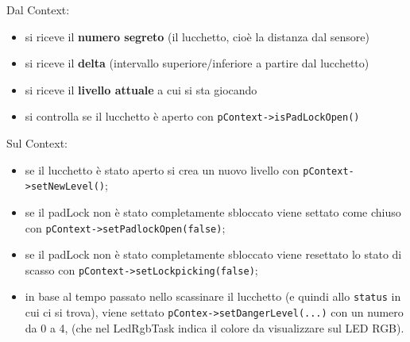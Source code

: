 Dal Context:
\begin{itemize}
	\item si riceve il \textbf{numero segreto} (il lucchetto, cioè la distanza dal sensore)
	\item si riceve il \textbf{delta} (intervallo superiore/inferiore a partire dal lucchetto)
	\item si riceve il \textbf{livello attuale} a cui si sta giocando
	\item si controlla se il lucchetto è aperto con \texttt{pContext->isPadLockOpen()}
\end{itemize}
Sul Context:
\begin{itemize}
	\item se il lucchetto è stato aperto si crea un nuovo livello con \texttt{pContext->setNewLevel()};
	\item se il padLock non è stato completamente sbloccato viene settato come chiuso con \texttt{pContext->setPadlockOpen(false)};
	\item se il padLock non è stato completamente sbloccato viene resettato lo stato di scasso con \texttt{pContext->setLockpicking(false)};
	\item in base al tempo passato nello scassinare il lucchetto (e quindi allo \texttt{status} in cui ci si trova), viene settato \texttt{pContex->setDangerLevel(...)} con un numero da 0 a 4, (che nel LedRgbTask indica il colore da visualizzare sul LED RGB).
\end{itemize}

